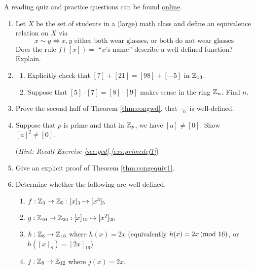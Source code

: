 \begin{exercises}{}{}
	A reading quiz and practice questions can be found \href{http://www.math.uci.edu/~ndonalds/math13/selftest/7-4-welldefn.html}{online}.

	\begin{enumerate}
	  \item Let $X$ be the set of students in a (large) math class and define an equivalence relation on $X$ via
	  \[
	  	x\sim y\iff x,y\text{ either both wear glasses, or both do not wear glasses}
	  \]
	  Does the rule $f([x])=$ ``$x$'s name'' describe a well-defined function? Explain.
	  
	  \item\begin{enumerate}
	    \item Explicitly check that $[7]+[21]=[98]+[-5]$ in $\mathbb{Z}_{13}$.
	    \item Suppose that $[5]\cdot[7]=[8]\cdot[9]$ makes sense in the ring $\mathbb{Z}_n$. Find $n$.
	  \end{enumerate}
	  
	    \item Prove the second half of Theorem \ref{thm:congwd}, that $\cdot_n$ is well-defined.
	  
	  
	  \item Suppose that $p$ is prime and that in $\mathbb{Z}_p$, we have $[a] \neq [0]$. Show $[a]^2 \neq [0]$.\par
	  (\emph{Hint: Recall Exercise \ref*{sec:gcd}.\ref{exs:primedef1}})
	  
	  
	  \item Give an explicit proof of Theorem \ref{thm:congequiv1}.
	 
	
		\item Determine whether the following are well-defined.
		\begin{enumerate}
		  \item $f:\mathbb{Z}_3\to\mathbb{Z}_5:[x]_3\mapsto [x^3]_5$
			\item $g:\mathbb{Z}_{10}\to\mathbb{Z}_{20}:[x]_{10}\mapsto [x^2]_{20}$
			\item $h:\mathbb{Z}_8\to\mathbb{Z}_{16}$ where $h(x)=2x$ \hfill (equivalently $h(x)=2x\negthickspace\pmod{16}$, or $h([x]_8)=[2x]_{16}$).
			\item $j:\mathbb{Z}_8\to\mathbb{Z}_{12}$ where $j(x)=2x$.
		\end{enumerate}
		

\end{enumerate}
\end{exercises}
